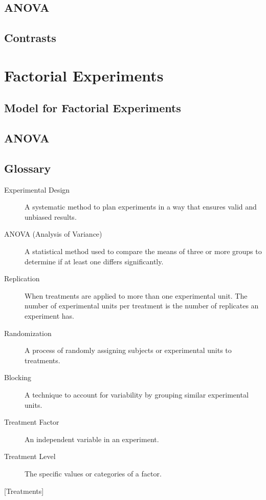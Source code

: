 \documentclass[
  letterpaper,
  DIV=11,
  numbers=noendperiod,
  oneside]{scrreprt}
\begin{document}
\chapter{ANOVA}\label{anova}

\chapter{Contrasts}\label{contrasts-1}

\part{Factorial Experiments}

\chapter{Model for Factorial
Experiments}\label{model-for-factorial-experiments}

\chapter{ANOVA}\label{anova-1}


\chapter*{Glossary}\label{glossary}


\begin{description}
\item[\label{glossary-experimental-design}{Experimental
Design}]
A systematic method to plan experiments in a way that ensures valid and
unbiased results.
\item[\label{glossary-anova-analysis-of-variance}{ANOVA
(Analysis of Variance)}]
A statistical method used to compare the means of three or more groups
to determine if at least one differs significantly.
\item[\label{glossary-replication}{Replication}]
When treatments are applied to more than one experimental unit. The
number of experimental units per treatment is the number of replicates
an experiment has.
\item[\label{glossary-randomization}{Randomization}]
A process of randomly assigning subjects or experimental units to
treatments.
\item[\label{glossary-blocking}{Blocking}]
A technique to account for variability by grouping similar experimental
units.
\item[\label{glossary-factor}{Treatment Factor}]
An independent variable in an experiment.
\item[\label{glossary-level}{Treatment Level}]
The specific values or categories of a factor.
\end{description}

{[}Treatments{]}
\end{document}
